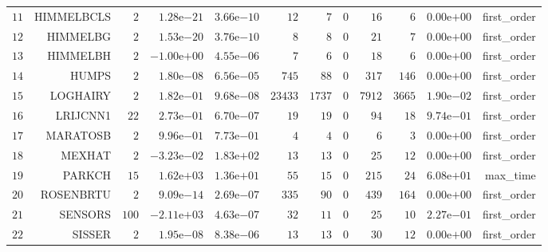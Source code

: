 \begin{longtable}{rrrrrrrrrrrr}
  \(    11\) & HIMMELBCLS & \(     2\) & \( 1.28\)e\(-21\) & \( 3.66\)e\(-10\) & \(    12\) & \(     7\) & \(     0\) & \(    16\) & \(     6\) & \( 0.00\)e\(+00\) & first\_order \\
  \(    12\) & HIMMELBG & \(     2\) & \( 1.53\)e\(-20\) & \( 3.76\)e\(-10\) & \(     8\) & \(     8\) & \(     0\) & \(    21\) & \(     7\) & \( 0.00\)e\(+00\) & first\_order \\
  \(    13\) & HIMMELBH & \(     2\) & \(-1.00\)e\(+00\) & \( 4.55\)e\(-06\) & \(     7\) & \(     6\) & \(     0\) & \(    18\) & \(     6\) & \( 0.00\)e\(+00\) & first\_order \\
  \(    14\) & HUMPS & \(     2\) & \( 1.80\)e\(-08\) & \( 6.56\)e\(-05\) & \(   745\) & \(    88\) & \(     0\) & \(   317\) & \(   146\) & \( 0.00\)e\(+00\) & first\_order \\
  \(    15\) & LOGHAIRY & \(     2\) & \( 1.82\)e\(-01\) & \( 9.68\)e\(-08\) & \( 23433\) & \(  1737\) & \(     0\) & \(  7912\) & \(  3665\) & \( 1.90\)e\(-02\) & first\_order \\
  \(    16\) & LRIJCNN1 & \(    22\) & \( 2.73\)e\(-01\) & \( 6.70\)e\(-07\) & \(    19\) & \(    19\) & \(     0\) & \(    94\) & \(    18\) & \( 9.74\)e\(-01\) & first\_order \\
  \(    17\) & MARATOSB & \(     2\) & \( 9.96\)e\(-01\) & \( 7.73\)e\(-01\) & \(     4\) & \(     4\) & \(     0\) & \(     6\) & \(     3\) & \( 0.00\)e\(+00\) & first\_order \\
  \(    18\) & MEXHAT & \(     2\) & \(-3.23\)e\(-02\) & \( 1.83\)e\(+02\) & \(    13\) & \(    13\) & \(     0\) & \(    25\) & \(    12\) & \( 0.00\)e\(+00\) & first\_order \\
  \(    19\) & PARKCH & \(    15\) & \( 1.62\)e\(+03\) & \( 1.36\)e\(+01\) & \(    55\) & \(    15\) & \(     0\) & \(   215\) & \(    24\) & \( 6.08\)e\(+01\) & max\_time \\
  \(    20\) & ROSENBRTU & \(     2\) & \( 9.09\)e\(-14\) & \( 2.69\)e\(-07\) & \(   335\) & \(    90\) & \(     0\) & \(   439\) & \(   164\) & \( 0.00\)e\(+00\) & first\_order \\
  \(    21\) & SENSORS & \(   100\) & \(-2.11\)e\(+03\) & \( 4.63\)e\(-07\) & \(    32\) & \(    11\) & \(     0\) & \(    25\) & \(    10\) & \( 2.27\)e\(-01\) & first\_order \\
  \(    22\) & SISSER & \(     2\) & \( 1.95\)e\(-08\) & \( 8.38\)e\(-06\) & \(    13\) & \(    13\) & \(     0\) & \(    30\) & \(    12\) & \( 0.00\)e\(+00\) & first\_order \\

\end{longtable}
